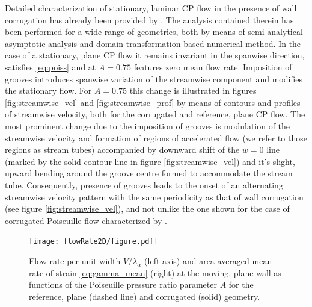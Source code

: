 \documentclass[lineno]{jfm}
\begin{document}
Detailed characterization of stationary, laminar CP flow in the presence of wall corrugation has already been provided by \citet{mohammadi2014effects}. The analysis contained therein has been performed for a wide range of geometries, both by means of semi-analytical asymptotic analysis and domain transformation based numerical method.
In the case of a stationary, plane CP flow it remains invariant in the spanwise direction, satisfies \eqref{eq:poiss} and at $A=0.75$ features zero mean flow rate.
Imposition of grooves introduces spanwise variation of the streamwise component and modifies the stationary flow.
For $A=0.75$ this change is illustrated in figures \ref{fig:streamwise_vel} and \ref{fig:streamwise_prof} by means of contours and profiles of streamwise velocity,
both for the corrugated and reference, plane CP flow.
The most prominent change due to the imposition of grooves is modulation of the streamwise velocity and formation of regions of accelerated flow (we refer to those regions as stream tubes) accompanied by downward shift of the $w=0$ line (marked by the solid contour line in figure \ref{fig:streamwise_vel}) and it's slight, upward bending around the groove centre formed to accommodate the stream tube.
Consequently, presence of grooves leads to the onset of an alternating streamwise velocity pattern with the same periodicity as that of wall corrugation (see figure \ref{fig:streamwise_vel}), and not unlike the one shown for the case of corrugated Poiseuille flow characterized by \citet{Nikesh2017}.

\begin{figure}
\centering
 \texttt{[image: flowRate2D/figure.pdf]}  
 \caption{Flow rate per unit width $\Dot{V}/\lambda_\alpha$ (left axis) and area averaged mean rate of strain \eqref{eq:gamma_mean} (right) at the moving, plane wall as functions of the Poiseuille pressure ratio parameter $A$ for the reference, plane (dashed line) and corrugated (solid) geometry.}
 \label{fig:flowRate_avgStrain}
\end{figure}
\end{document}
